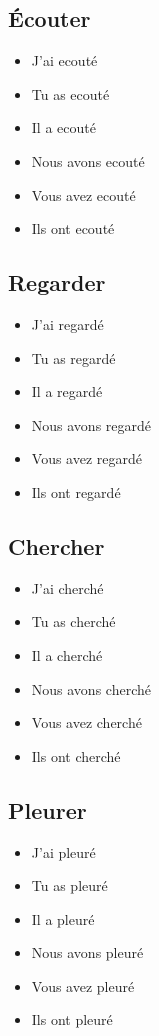 \subsection{Écouter}

\begin{itemize}
    \item J'ai ecouté
    \item Tu as ecouté 
    \item Il a ecouté 
    \item Nous avons ecouté
    \item Vous avez ecouté
    \item Ils ont ecouté
\end{itemize}

\subsection{Regarder}

\begin{itemize}
    \item J'ai regardé 
    \item Tu as regardé 
    \item Il a regardé 
    \item Nous avons regardé 
    \item Vous avez regardé 
    \item Ils ont regardé 
\end{itemize}

\subsection{Chercher}

\begin{itemize}
    \item J'ai cherché
    \item Tu as cherché 
    \item Il a cherché 
    \item Nous avons cherché
    \item Vous avez cherché 
    \item Ils ont cherché
\end{itemize}

\subsection{Pleurer}

\begin{itemize}
    \item J'ai pleuré
    \item Tu as pleuré 
    \item Il a pleuré 
    \item Nous avons pleuré 
    \item Vous avez pleuré 
    \item Ils ont pleuré
\end{itemize}

